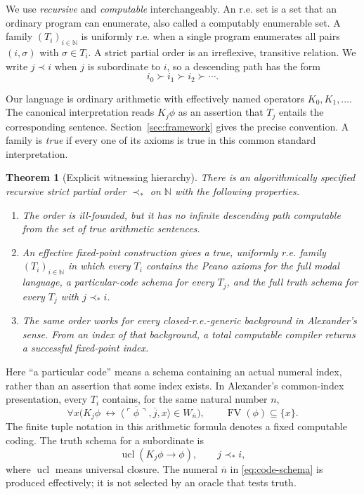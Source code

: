 \documentclass[11pt]{article}
\newtheorem{theorem}{Theorem}
\theoremstyle{definition}
\newcommand{\N}{\mathbb N}
\newcommand{\FV}{\operatorname{FV}}
\newcommand{\ucl}{\operatorname{ucl}}
\newcommand{\code}[1]{\ulcorner #1\urcorner}
\newcommand{\num}[1]{\overline{#1}}
\begin{document}
We use \emph{recursive} and \emph{computable} interchangeably. An r.e. set is
a set that an ordinary program can enumerate, also called a computably
enumerable set. A family $(T_i)_{i\in\N}$ is uniformly r.e. when a single
program enumerates all pairs $(i,\sigma)$ with $\sigma\in T_i$. A strict
partial order is an irreflexive, transitive relation. We write $j\prec i$ when
$j$ is subordinate to $i$, so a descending path has the form
\[
 i_0\succ i_1\succ i_2\succ\cdots.
\]

Our language is ordinary arithmetic with effectively named operators
$K_0,K_1,\ldots$. The canonical interpretation reads $K_j\phi$ as an assertion
that $T_j$ entails the corresponding sentence. Section~\ref{sec:framework}
gives the precise convention. A family is \emph{true} if every one of its
axioms is true in this common standard interpretation.

\begin{theorem}[Explicit witnessing hierarchy]\label{thm:main}
There is an algorithmically specified recursive strict partial order
$\prec_*$ on $\N$ with the following properties.
\begin{enumerate}
\item The order is ill-founded, but it has no infinite descending path
computable from the set of true arithmetic sentences.
\item An effective fixed-point construction gives a true, uniformly r.e.
family $(T_i)_{i\in\N}$ in which every $T_i$ contains the Peano axioms for the
full modal language, a particular-code schema for every $T_j$, and the full
truth schema for every $T_j$ with $j\prec_*i$.
\item The same order works for every closed-r.e.-generic background in
Alexander's sense. From an index of that background, a total computable
compiler returns a successful fixed-point index.
\end{enumerate}
\end{theorem}

Here ``a particular code'' means a schema containing an actual numeral index,
rather than an assertion that some index exists. In Alexander's common-index
presentation, every $T_i$ contains, for the same natural number $n$,
\begin{equation}\label{eq:code-schema}
 \forall x\bigl(K_j\phi\ \leftrightarrow\
 \langle\num{\code{\phi}},\num j,x\rangle\in W_{\num n}\bigr),
 \qquad \FV(\phi)\subseteq\{x\}.
\end{equation}
The finite tuple notation in this arithmetic formula denotes a fixed
computable coding. The truth schema for a subordinate is
\begin{equation}\label{eq:truth-schema}
 \ucl(K_j\phi\to\phi),\qquad j\prec_*i,
\end{equation}
where $\ucl$ means universal closure. The numeral $\num n$ in
\eqref{eq:code-schema} is produced effectively; it is not selected by an
oracle that tests truth.
\end{document}
